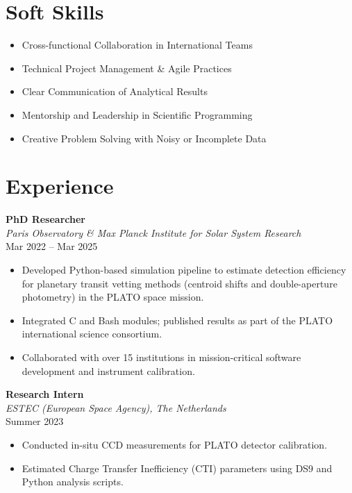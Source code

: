 \documentclass[10pt,a4paper]{article}
\begin{document}
\section*{Soft Skills}
\begin{itemize}[leftmargin=1.5em]
    \item Cross-functional Collaboration in International Teams
    \item Technical Project Management \& Agile Practices
    \item Clear Communication of Analytical Results
    \item Mentorship and Leadership in Scientific Programming
    \item Creative Problem Solving with Noisy or Incomplete Data
\end{itemize}

\section*{Experience}

\textbf{PhD Researcher} \\
\textit{Paris Observatory \& Max Planck Institute for Solar System Research} \\
Mar 2022 -- Mar 2025
\begin{itemize}[leftmargin=1.5em]
    \item Developed Python-based simulation pipeline to estimate detection efficiency for planetary transit vetting methods (centroid shifts and double-aperture photometry) in the PLATO space mission.
    \item Integrated C and Bash modules; published results as part of the PLATO international science consortium.
    \item Collaborated with over 15 institutions in mission-critical software development and instrument calibration.
\end{itemize}

\textbf{Research Intern} \\
\textit{ESTEC (European Space Agency), The Netherlands} \\
Summer 2023
\begin{itemize}[leftmargin=1.5em]
    \item Conducted in-situ CCD measurements for PLATO detector calibration.
    \item Estimated Charge Transfer Inefficiency (CTI) parameters using DS9 and Python analysis scripts.
\end{itemize}
\end{document}

